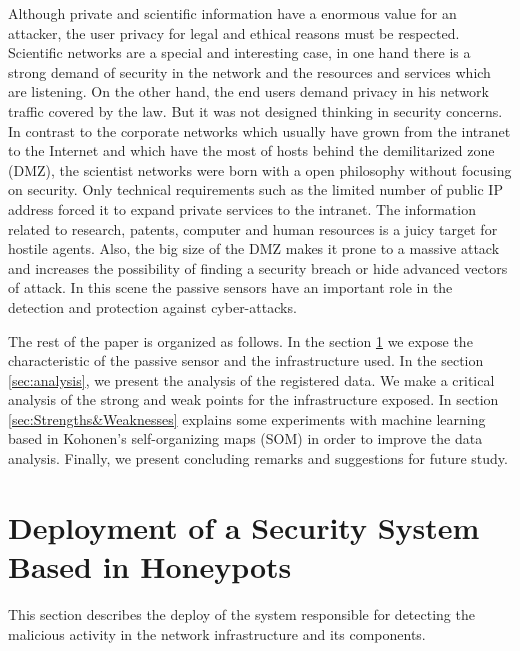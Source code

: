 \documentclass[a4paper]{llncs}
\begin{document}
Although private and scientific information have a enormous value for an attacker, the user privacy for legal and ethical reasons must be respected. Scientific networks are a special and interesting case, in one hand there is a strong demand of security in the network and the resources and services which are listening. On the other hand, the end users demand privacy in his network traffic covered by the law. But it was not designed thinking in security concerns\cite{iris-proyecto}. In contrast to the corporate networks which usually have grown from the intranet to the Internet and which have the most of hosts behind the demilitarized zone (DMZ), the scientist networks were born with a open philosophy without focusing on security\cite{iris-proyecto}. Only technical requirements such as the limited number of public IP address forced it to expand private services to the intranet. The information related to research, patents, computer and human resources is a juicy target for hostile agents. Also, the big size of the DMZ makes it prone to a massive attack and increases the possibility of finding a security breach or hide advanced vectors of attack. In this scene the passive sensors have an important role in the detection and protection against cyber-attacks.

The rest of the paper is organized as follows. In the section \ref{sec:deployment} we expose the characteristic of the passive sensor and the infrastructure used. In the section \ref{sec:analysis}, we present the analysis of the registered data. We make a critical analysis of the strong and weak points for the infrastructure exposed. In section \ref{sec:Strengths&Weaknesses} explains some experiments with machine learning based in Kohonen's self-organizing maps (SOM)\cite{kohonen-1990} in order to improve the data analysis. Finally, we present concluding remarks and suggestions for future study.


\section{Deployment of a Security System Based in Honeypots}
\label{sec:deployment}
This section describes the deploy of the system responsible for detecting the malicious activity in the network infrastructure and its components.
\end{document}

